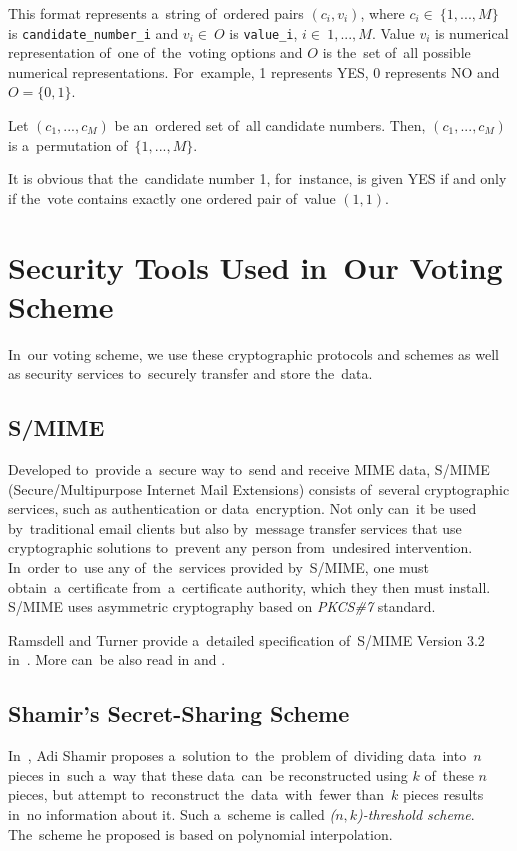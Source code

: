 This format represents a~string of~ordered pairs $(c_i, v_i)$, where $c_i \in~\{1,...,M\}$ is \newline \texttt{candidate\_number\_i} and $v_i \in~O$ is \texttt{value\_i}, $i\in~1,...,M$. Value $v_i$ is numerical representation of~one of~the~voting options and $O$ is the~set of~all possible numerical representations. For~example, 1 represents YES, 0 represents NO and $O = \{0, 1\}$. 

Let $(c_1, ..., c_M)$ be an~ordered set of~all candidate numbers. Then, $(c_1, ..., c_M)$ is a~permutation of~$\{1,...,M\}$.

It is obvious that the~candidate number 1, for~instance, is given YES if and only if the~vote contains exactly one ordered pair of~value $(1, 1)$.

\section{Security Tools Used in~Our Voting Scheme}
\label{sek:cryptography}
In~our voting scheme, we use these cryptographic protocols and schemes as well as security services to~securely transfer and store the~data.
\subsection{S/MIME}
Developed to~provide a~secure way to~send and receive MIME data, S/MIME (Secure/Multipurpose Internet Mail Extensions) consists of~several cryptographic services, such as authentication or data~encryption. Not only can~it be used by~traditional email clients but also by~message transfer services that use cryptographic solutions to~prevent any person from~undesired intervention. In~order to~use any of~the~services provided by~S/MIME, one must obtain~a~certificate from~a~certificate authority, which they then must install. S/MIME uses asymmetric cryptography based on \emph{PKCS\#7} standard.


Ramsdell and Turner provide a~detailed specification of~S/MIME Version 3.2 in~\cite{Ramsdell}. More can~be also read in \cite{Turner} and \cite{SMIME}.
\subsection{Shamir's Secret-Sharing Scheme}
In~\cite{Shamir}, Adi Shamir proposes a~solution to~the~problem of~dividing data~into~$n$ pieces in~such a~way that these data~can~be reconstructed using $k$ of~these $n$ pieces, but attempt to~reconstruct the~data~with~fewer than~$k$ pieces results in~no information about it. Such a~scheme is called \emph{($n,k$)-threshold scheme}. The~scheme he proposed is based on polynomial interpolation. 

